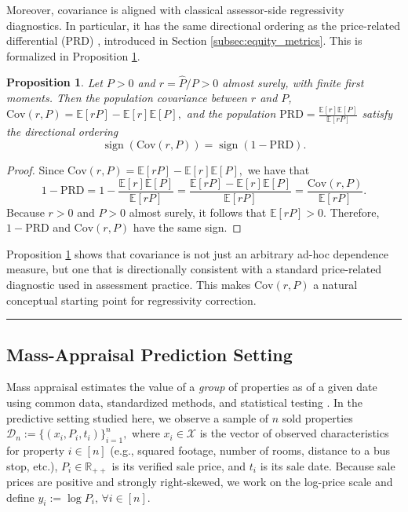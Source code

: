 \documentclass[12pt, draft]{article}
\theoremstyle{plain}
\newtheorem{proposition}{Proposition}
\theoremstyle{definition}
\newcommand{\1}{\mathbf{1}}
\newcommand{\Cov}{\text{Cov}}
\newcommand{\Expected}[1]{\mathbb{E}[#1]}
\begin{document}
{Moreover, covariance is aligned with classical assessor-side regressivity diagnostics. In particular, it has the same directional ordering as the price-related differential (PRD) \cite{IAAO2025ExposureRatio}, introduced in Section \ref{subsec:equity_metrics}. This is formalized in Proposition \ref{prop:cov_prd}.

\begin{proposition}
\label{prop:cov_prd}
Let $P>0$ and $r=\widehat P/P>0$ almost surely, with finite first moments. Then the population covariance between $r$ and $P$, $\Cov(r,P)=\Expected{rP}-\Expected{r}\Expected{P},$ and the population
$
\mathrm{PRD}=\frac{\Expected{r}\Expected{P}}{\Expected{rP}}$
satisfy the directional ordering
\begin{equation}
\label{eq:cov_prd_sign}
\operatorname{sign}\!\left(\Cov(r,P)\right)
=
\operatorname{sign}\!\left(1-\mathrm{PRD}\right).
\end{equation}
\end{proposition}

\begin{proof}
Since
$
\Cov(r,P)=\Expected{rP}-\Expected{r}\Expected{P},
$
we have that
\[
1-\mathrm{PRD}
=
1-\frac{\Expected{r}\Expected{P}}{\Expected{rP}}
=
\frac{\Expected{rP}-\Expected{r}\Expected{P}}{\Expected{rP}}
=
\frac{\Cov(r,P)}{\Expected{rP}}.
\]
Because $r>0$ and $P>0$ almost surely, it follows that $\Expected{rP}>0$. Therefore, $1-\mathrm{PRD}$ and $\Cov(r,P)$ have the same sign.
\end{proof}

\noindent Proposition \ref{prop:cov_prd} shows that covariance is not just an arbitrary ad-hoc dependence measure, but one that is directionally consistent with a standard price-related diagnostic used in assessment practice. This makes $\Cov(r,P)$ a natural conceptual starting point for regressivity correction.


\hrule

\subsection{Mass-Appraisal Prediction Setting}
\label{subsec:prediction_setting}

Mass appraisal estimates the value of a \emph{group} of properties as of a given date using common data, standardized methods, and statistical testing \cite{IAAO2025Mass}. In the predictive setting studied here, we observe a sample of $n$ sold properties
$
\mathcal{D}_n := \{(x_i,P_i,t_i)\}_{i=1}^n,
$
where $x_i \in \mathcal{X}$ is the vector of observed characteristics for property $i \in [n]$ (e.g., squared footage, number of rooms, distance to a bus stop, etc.), $P_i \in \mathbb{R}_{++}$ is its verified sale price, and $t_i$ is its sale date. Because sale prices are positive and strongly right-skewed, we work on the log-price scale and define
$
y_i := \log P_i,
\, \forall i \in [n].
$

}
\end{document}
